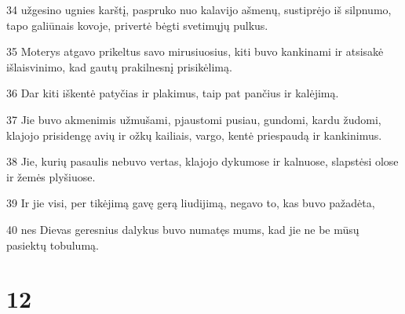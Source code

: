 \par 34 užgesino ugnies karštį, paspruko nuo kalavijo ašmenų, sustiprėjo iš silpnumo, tapo galiūnais kovoje, privertė bėgti svetimųjų pulkus. 
\par 35 Moterys atgavo prikeltus savo mirusiuosius, kiti buvo kankinami ir atsisakė išlaisvinimo, kad gautų prakilnesnį prisikėlimą. 
\par 36 Dar kiti iškentė patyčias ir plakimus, taip pat pančius ir kalėjimą. 
\par 37 Jie buvo akmenimis užmušami, pjaustomi pusiau, gundomi, kardu žudomi, klajojo prisidengę avių ir ožkų kailiais, vargo, kentė priespaudą ir kankinimus. 
\par 38 Jie, kurių pasaulis nebuvo vertas, klajojo dykumose ir kalnuose, slapstėsi olose ir žemės plyšiuose. 
\par 39 Ir jie visi, per tikėjimą gavę gerą liudijimą, negavo to, kas buvo pažadėta, 
\par 40 nes Dievas geresnius dalykus buvo numatęs mums, kad jie ne be mūsų pasiektų tobulumą.


\chapter{12}


